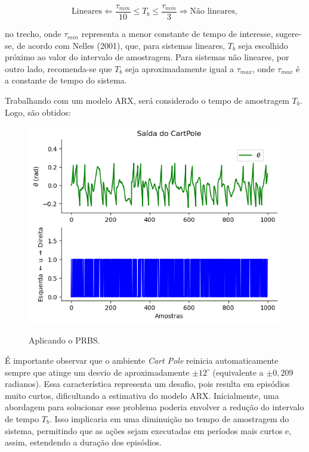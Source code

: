 \documentclass[12pt,           %
a4paper,                       %
openany,                       %
oneside,                       %
chapter=TITLE,                 %
english,                       %
spanish,                       %
brazil,                        %
sumario=tradicional]{abntex2}  %
\begin{document}
\begin{OnehalfSpace}
\begin{equation}
    \text{Lineares} \Leftarrow \frac{\tau_{min}}{10} \leq T_b \leq \frac{\tau_{min}}{3} \Rightarrow \text{Não lineares},
    \label{eq:prbs}
\end{equation}

\noindent no trecho, onde $\tau_{min}$ representa a menor constante de tempo de interesse, sugere-se, de acordo com Nelles (2001)\cite{nelles}, que, para sistemas lineares, $T_b$ seja escolhido próximo ao valor do intervalo de amostragem. Para sistemas não lineares, por outro lado, recomenda-se que $T_b$ seja aproximadamente igual a $\tau_{max}$, onde $\tau_{max}$ é a constante de tempo do sistema.

Trabalhando com um modelo ARX, será considerado o tempo de amostragem $T_b$. Logo, são obtidos:


\begin{figure}[H]
     \centering
     \vspace*{-.2cm}
     \caption{Aplicando o PRBS.}
     \includegraphics[scale=0.55]{teste.png}
     \label{fig:PRBSa}
\end{figure}
\vspace*{-0.7cm}
{\raggedright {}}

É importante observar que o ambiente \textit{Cart Pole} reinicia automaticamente sempre que atinge um desvio de aproximadamente $\pm 12^\circ$ (equivalente a $\pm 0,209$ radianos). Essa característica representa um desafio, pois resulta em episódios muito curtos, dificultando a estimativa do modelo ARX. Inicialmente, uma abordagem para solucionar esse problema poderia envolver a redução do intervalo de tempo $T_b$. Isso implicaria em uma diminuição no tempo de amostragem do sistema, permitindo que as ações sejam executadas em períodos mais curtos e, assim, estendendo a duração dos episódios.


\end{OnehalfSpace}
\end{document}
